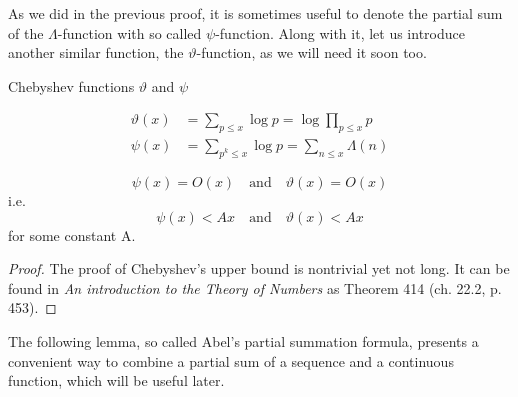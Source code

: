 \documentclass{article}
\begin{document}
As we did in the previous proof, it is sometimes useful to denote the partial sum of the $\Lambda$-function with so called $\psi$-function. Along with it, let us introduce another similar function, the $\vartheta$-function, as we will need it soon too.

\begin{definition}
Chebyshev functions $\vartheta$ and $\psi$

\begin{align*}
     \vartheta(x) & = \sum_{p\leq x} \log p = \log \prod_{p\leq x} p\\
    \psi(x) & = \sum_{p^k\leq x} \log p = \sum_{n\leq x} \Lambda(n)
\end{align*}
\end{definition}

\begin{lemma}
\label{lemma:cheb}
\begin{equation*}
    \psi(x) = O(x) \quad\text{and}\quad \vartheta(x)=O(x)
\end{equation*}
i.e.
\begin{equation*}
    \psi(x) < Ax \quad\text{and}\quad \vartheta(x) < Ax
\end{equation*}
for some constant A.
\begin{proof}
The proof of Chebyshev's upper bound is nontrivial yet not long. It can be found in \textit{An introduction to the Theory of Numbers} \cite{HardyWright} as Theorem 414 (ch. 22.2, p. 453).
\end{proof}
\end{lemma}

The following lemma, so called Abel's partial summation formula, presents a convenient way to combine a partial sum of a sequence and a continuous function, which will be useful later.
\end{document}
